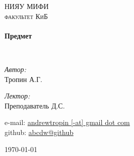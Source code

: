 \begin{titlepage}
  \begin{center}


    \textsc{\LARGE НИЯУ МИФИ}\\[1.5cm]

    \textsc{\Large факультет КиБ}\\[0.5cm]

    \HRule \\[0.4cm]
    {\huge \bfseries Предмет\\[0.4cm]}

    \HRule \\[1.5cm]

    \begin{minipage}{0.4\textwidth}
      \begin{flushleft} \large
        \emph{Автор:}\\
        Тропин \textsc{А.Г.}
      \end{flushleft}
    \end{minipage}
    \begin{minipage}{0.4\textwidth}
      \begin{flushright} \large
        \emph{Лектор:} \\
        Преподаватель \textsc{Д.С.}
      \end{flushright}
    \end{minipage}

    \vfill
    \begin{flushleft}
      e-mail: \href{mailto:andrewtropin@gmail.com}{andrewtropin [-at] gmail dot com} \\
      github: \href{http://github.com/abcdw}{abcdw@github}
    \end{flushleft}
    {\large \today}
  \end{center}
\end{titlepage}

